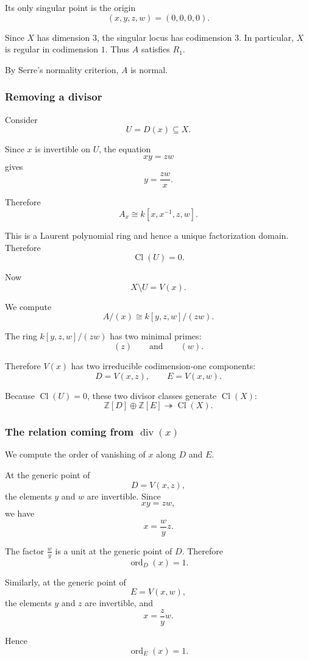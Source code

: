 Its only singular point is the origin
\[
(x,y,z,w)=(0,0,0,0).
\]

Since \(X\) has dimension \(3\), the singular locus has codimension \(3\). In particular, \(X\) is regular in codimension \(1\). Thus \(A\) satisfies \(R_1\).

By Serre's normality criterion, \(A\) is normal.

\subsubsection{Removing a divisor}

Consider
\[
U=D(x)\subseteq X.
\]

Since \(x\) is invertible on \(U\), the equation
\[
xy=zw
\]
gives
\[
y=\frac{zw}{x}.
\]

Therefore
\[
A_x
\cong
k[x,x^{-1},z,w].
\]

This is a Laurent polynomial ring and hence a unique factorization domain. Therefore
\[
\operatorname{Cl}(U)=0.
\]

Now
\[
X\setminus U=V(x).
\]

We compute
\[
A/(x)
\cong
k[y,z,w]/(zw).
\]

The ring \(k[y,z,w]/(zw)\) has two minimal primes:
\[
(z)
\qquad\text{and}\qquad
(w).
\]

Therefore \(V(x)\) has two irreducible codimension-one components:
\[
D=V(x,z),
\qquad
E=V(x,w).
\]

Because \(\operatorname{Cl}(U)=0\), these two divisor classes generate \(\operatorname{Cl}(X)\):
\[
\mathbb{Z}[D]\oplus \mathbb{Z}[E]
\twoheadrightarrow
\operatorname{Cl}(X).
\]

\subsubsection{The relation coming from \(\operatorname{div}(x)\)}

We compute the order of vanishing of \(x\) along \(D\) and \(E\).

At the generic point of
\[
D=V(x,z),
\]
the elements \(y\) and \(w\) are invertible. Since
\[
xy=zw,
\]
we have
\[
x=\frac{w}{y}z.
\]

The factor \(\frac{w}{y}\) is a unit at the generic point of \(D\). Therefore
\[
\operatorname{ord}_D(x)=1.
\]

Similarly, at the generic point of
\[
E=V(x,w),
\]
the elements \(y\) and \(z\) are invertible, and
\[
x=\frac{z}{y}w.
\]

Hence
\[
\operatorname{ord}_E(x)=1.
\]

